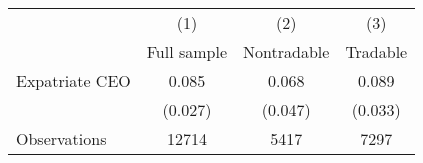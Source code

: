 \begin{tabular}{l*{3}{c}}
\hline\hline
                    &\multicolumn{1}{c}{(1)}&\multicolumn{1}{c}{(2)}&\multicolumn{1}{c}{(3)}\\
                    &\multicolumn{1}{c}{Full sample}&\multicolumn{1}{c}{Nontradable}&\multicolumn{1}{c}{Tradable}\\
\hline
Expatriate CEO      &       0.085&       0.068&       0.089\\
                    &     (0.027)&     (0.047)&     (0.033)\\
\hline
Observations        &       12714&        5417&        7297\\
\hline\hline
\end{tabular}

